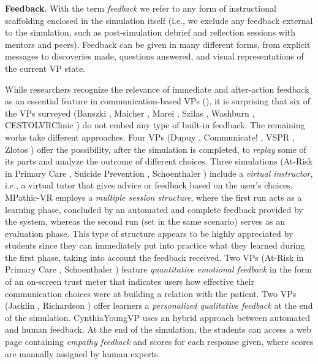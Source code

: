 \textbf{Feedback}. With the term \emph{feedback} we refer to any form of instructional scaffolding enclosed in the simulation itself (i.e., we exclude any feedback external to the simulation, such as post-simulation debrief and reflection sessions with mentors and peers).
Feedback can be given in many different forms, from explicit messages to discoveries made, questions answered, and visual representations of the current VP state. 

While researchers recognize the relevance of immediate and after-action feedback as an essential feature in communication-based VPs (\cite{adefila2020students,jacklin2018improving,marei2018use,peddle2019exploring,quail2016student}), 
it is surprising that six of the VPs surveyed (Banszki \cite{banszki2018clinical,quail2016student}, Maicher \cite{maicher2017developing}, Marei \cite{marei2018use}, Szilas \cite{szilas2019virtual}, Washburn \cite{washburn2020virtual}, CESTOLVRClinic \cite{sapkaroski2018implementation}) do not embed any type of built-in feedback. 
The remaining works take different approaches. Four VPs (Dupuy \cite{dupuy2019virtual}, Communicate! \cite{jeuring2015communicate}, VSPR \cite{peddle2019exploring,peddle2019development}, Zlotos \cite{zlotos2016scenario}) offer the possibility, after the simulation is completed, to \textit{replay} some of its parts and analyze the outcome of different choices. 
Three simulations (At-Risk in Primary Care \cite{albright2018using}, Suicide Prevention \cite{o2019suicide},  Schoenthaler \cite{schoenthaler2017simulated}) include a \emph{virtual instructor}, i.e., a virtual tutor that gives advice or feedback based on the user's choices.
MPathic-VR \cite{guetterman2019medical,kron2017using} employs a \emph{multiple session structure}, where the first run acts as a learning phase, concluded by an automated and complete feedback provided by the system, whereas the second run (set in the same scenario) serves as an evaluation phase. This type of structure appears to be highly appreciated by students since they can immediately put into practice what they learned during the first phase, taking into account the feedback received.
Two VPs (At-Risk in Primary Care \cite{albright2018using}, Schoenthaler \cite{schoenthaler2017simulated}) feature \emph{quantitative emotional feedback} in the form of an on-screen trust meter that indicates users how effective their communication choices were at building a relation with the patient. Two VPs (Jacklin \cite{jacklin2019virtual,jacklin2018improving}, Richardson \cite{richardson2019virtual}) offer learners a \emph{personalized qualitative feedback} at the end of the simulation. CynthiaYoungVP \cite{foster2016using} uses an hybrid approach between automated and human feedback. At the end of the simulation, the students can access a web page containing \emph{empathy feedback} and scores for each response given, where scores are manually assigned by human experts. 
